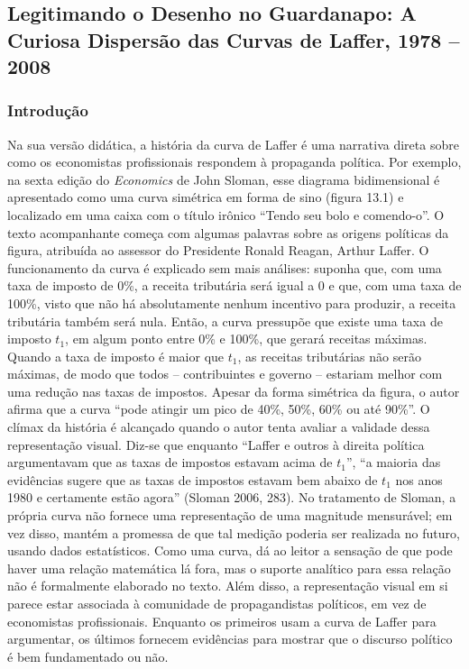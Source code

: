 \documentclass[12pt]{article}
\begin{document}
\section{}

\subsection{\textbf{Legitimando o Desenho no Guardanapo: A Curiosa Dispersão das Curvas de Laffer, 1978 – 2008}}

\subsubsection{\textbf{Introdução}}

Na sua versão didática, a história da curva de Laffer é uma narrativa direta sobre como os economistas profissionais respondem à propaganda política. Por exemplo, na sexta edição do \textit{Economics} de John Sloman, esse diagrama bidimensional é apresentado como uma curva simétrica em forma de sino (figura 13.1) e localizado em uma caixa com o título irônico ``Tendo seu bolo e comendo-o''. O texto acompanhante começa com algumas palavras sobre as origens políticas da figura, atribuída ao assessor do Presidente Ronald Reagan, Arthur Laffer. O funcionamento da curva é explicado sem mais análises: suponha que, com uma taxa de imposto de 0\%, a receita tributária será igual a 0 e que, com uma taxa de 100\%, visto que não há absolutamente nenhum incentivo para produzir, a receita tributária também será nula. Então, a curva pressupõe que existe uma taxa de imposto $t_1$, em algum ponto entre 0\% e 100\%, que gerará receitas máximas. Quando a taxa de imposto é maior que $t_1$, as receitas tributárias não serão máximas, de modo que todos -- contribuintes e governo -- estariam melhor com uma redução nas taxas de impostos. Apesar da forma simétrica da figura, o autor afirma que a curva ``pode atingir um pico de 40\%, 50\%, 60\% ou até 90\%''. O clímax da história é alcançado quando o autor tenta avaliar a validade dessa representação visual. Diz-se que enquanto ``Laffer e outros à direita política argumentavam que as taxas de impostos estavam acima de $t_1$'', ``a maioria das evidências sugere que as taxas de impostos estavam bem abaixo de $t_1$ nos anos 1980 e certamente estão agora'' (Sloman 2006, 283). No tratamento de Sloman, a própria curva não fornece uma representação de uma magnitude mensurável; em vez disso, mantém a promessa de que tal medição poderia ser realizada no futuro, usando dados estatísticos. Como uma curva, dá ao leitor a sensação de que pode haver uma relação matemática lá fora, mas o suporte analítico para essa relação não é formalmente elaborado no texto. Além disso, a representação visual em si parece estar associada à comunidade de propagandistas políticos, em vez de economistas profissionais. Enquanto os primeiros usam a curva de Laffer para argumentar, os últimos fornecem evidências para mostrar que o discurso político é bem fundamentado ou não.
\end{document}
